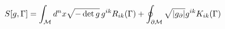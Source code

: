 \documentclass[preview]{standalone}
\begin{document}
\begin{align*}
\special{dvisvgm:raw <g id='unique000'>}S[g,\Gamma] = \int_{\mathcal{M}} d^nx\sqrt{-\det g}\,g^{ik}R_{ik}(\Gamma) + \oint_{\partial\mathcal{M}}\sqrt{|g_\partial|}g^{ik}K_{ik}(\Gamma)\special{dvisvgm:raw </g>}
\end{align*}
\end{document}
